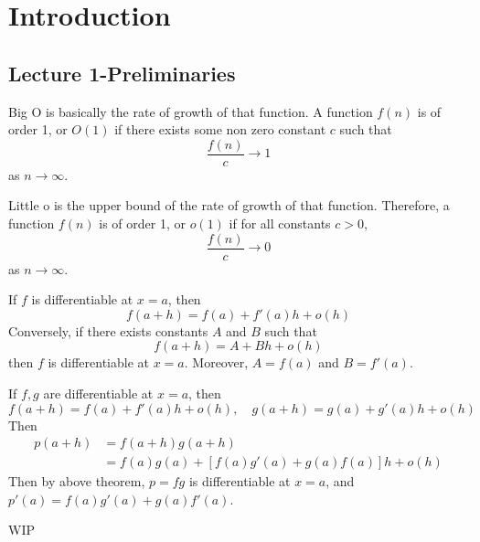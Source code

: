 
% 
\section{Introduction}
\subsection{Lecture 1-Preliminaries}

\begin{definition}
    Big O is basically the rate of growth of that function. A function $f(n)$ is of order 1, or $O(1)$ if there exists some non zero constant $c$ such that $$\frac{f(n)}{c} \rightarrow 1$$ as $n \rightarrow \infty$.

    Little o is the upper bound of the rate of growth of that function. Therefore, a function $f(n)$ is of order 1, or $o(1)$ if for all constants $c > 0$, $$\frac{f(n)}{c} \rightarrow 0$$ as $n \rightarrow \infty$.
\end{definition}

\begin{definition}
    If $f$ is differentiable at $x = a$, then $$f(a + h) = f(a) + f'(a)h + o(h)$$
    Conversely, if there exists constants $A$ and $B$ such that $$f(a + h) = A + Bh + o(h)$$ then $f$ is differentiable at $x = a$. Moreover, $A = f(a)$ and $B = f'(a)$.
\end{definition}
\begin{definition}
    If $f, g$ are differentiable at $x = a$, then $$f(a + h) = f(a) + f'(a)h + o(h), \quad g(a + h) = g(a) + g'(a)h + o(h)$$
    Then
    \begin{align*}
        p(a + h) &= f(a + h)g(a + h) \\
        &= f(a)g(a) + [f(a)g'(a) + g(a)f(a)]h + o(h) 
    \end{align*}
    Then by above theorem, $p = fg$ is differentiable at $x = a$, and $p'(a) = f(a)g'(a) + g(a)f'(a)$.
\end{definition}
\begin{definition}
    WIP
\end{definition}



